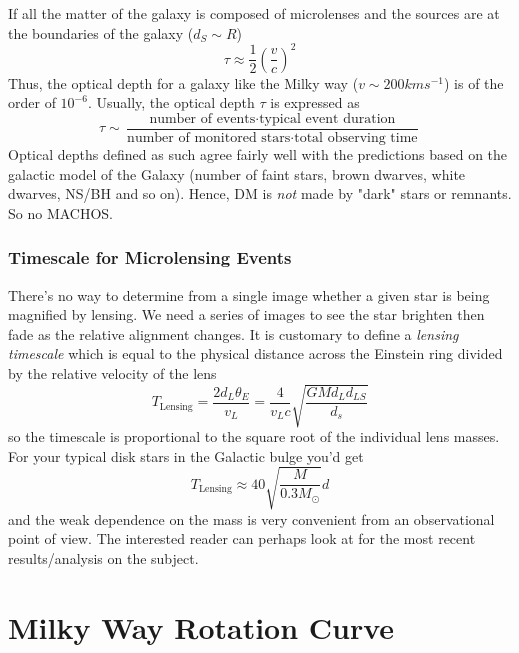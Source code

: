 If all the matter of the galaxy is composed of microlenses and the sources are at the boundaries of the galaxy ($d_{S}\sim R$)
\begin{equation*}
    \tau \approx \frac{1}{2}\left(\frac{v}{c}\right)^{2}
\end{equation*}
Thus, the optical depth for a galaxy like the Milky way ($v \sim 200\unit{km}\unit{s}^{-1}$) is of the order of $10^{-6}$. Usually, the optical depth $\tau$ is expressed as 
\begin{equation*}
    \tau \sim \frac{\text{number of events}\cdot\text{typical event duration}}{\text{number of monitored stars}\cdot\text{total observing time}}
\end{equation*}
Optical depths defined as such agree fairly well with the predictions based on the galactic model of the Galaxy (number of faint stars, brown dwarves, white dwarves, NS/BH and so on). Hence, DM is \emph{not} made by "dark" stars or remnants. So no MACHOS.

\subsubsection*{Timescale for Microlensing Events}

There's no way to determine from a single image whether a given star is being magnified by lensing. We need a series of images to see the star brighten then fade as the relative alignment changes. It is customary to define a \emph{lensing timescale} which is equal to the physical distance across the Einstein ring divided by the relative velocity of the lens
\begin{equation}
    T_{\text{Lensing}} = \frac{2d_{L}\theta_{E}}{v_{L}} = \frac{4}{v_{L}c}\sqrt{\frac{GMd_{L}d_{LS}}{d_{s}}}
    \label{eq:lensing_ts}
\end{equation}
so the timescale is proportional to the square root of the individual lens masses. For your typical disk stars in the Galactic bulge you'd get
\begin{equation*}
    T_{\text{Lensing}} \approx 40\sqrt{\frac{M}{0.3M_{\odot}}}\unit{d}
\end{equation*}
and the weak dependence on the mass is very convenient from an observational point of view. The interested reader can perhaps look at \cite{green2026stellarmicrolensingsurveysprobe} for the most recent results/analysis on the subject.

\newpage
\section{Milky Way Rotation Curve}

